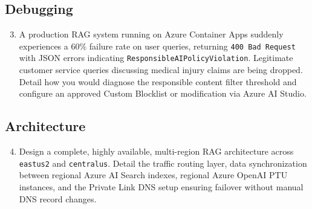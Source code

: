 \subsection{Debugging}
\begin{enumerate}[leftmargin=18pt]
  \setcounter{enumi}{2}
  \item A production RAG system running on Azure Container Apps suddenly experiences a 60\% failure rate on user queries, returning \texttt{400 Bad Request} with JSON errors indicating \texttt{ResponsibleAIPolicyViolation}. Legitimate customer service queries discussing medical injury claims are being dropped. Detail how you would diagnose the responsible content filter threshold and configure an approved Custom Blocklist or modification via Azure AI Studio.
\end{enumerate}

\subsection{Architecture}
\begin{enumerate}[leftmargin=18pt]
  \setcounter{enumi}{3}
  \item Design a complete, highly available, multi-region RAG architecture across \texttt{eastus2} and \texttt{centralus}. Detail the traffic routing layer, data synchronization between regional Azure AI Search indexes, regional Azure OpenAI PTU instances, and the Private Link DNS setup ensuring failover without manual DNS record changes.
\end{enumerate}

